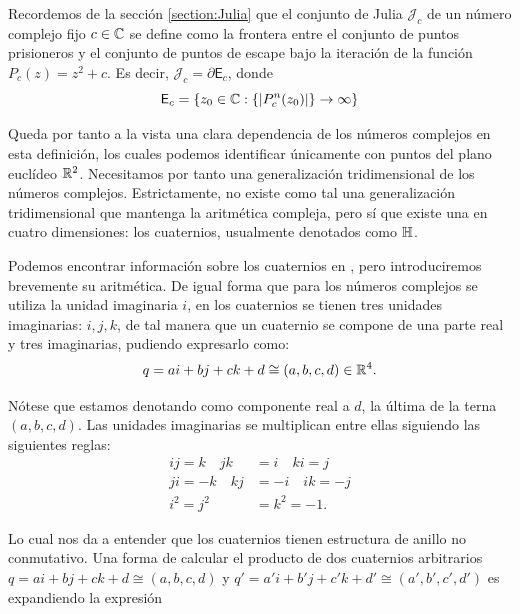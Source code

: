 Recordemos de la sección \ref{section:Julia} que el conjunto de Julia $\mathcal{J}_c$ de un número complejo fijo $c\in\mathbb{C}$ se define como la frontera entre el conjunto de puntos prisioneros y el conjunto de puntos de escape bajo la iteración de la función $P_{c}(z)=z^2+c$. Es decir, $\mathcal{J}_c = \partial \mathsf{E}_c$, donde
\begin{equation}
    \mathsf{E}_c = \{z_0\in\mathbb{C}: \{|P_c^n(z_0)|\}\rightarrow \infty \}
\end{equation}

Queda por tanto a la vista una clara dependencia de los números complejos en esta definición, los cuales podemos identificar únicamente con puntos del plano euclídeo $\mathbb{R}^2$. Necesitamos por tanto una generalización tridimensional de los números complejos. Estrictamente, no existe como tal una generalización tridimensional que mantenga la aritmética compleja, pero sí que existe una en cuatro dimensiones: los cuaternios, usualmente denotados como $\mathbb{H}$.

Podemos encontrar información sobre los cuaternios en \cite{quaternions}, pero introduciremos brevemente su aritmética. De igual forma que para los números complejos se utiliza la unidad imaginaria $i$, en los cuaternios se tienen tres unidades imaginarias: $i,j,k$, de tal manera que un cuaternio se compone de una parte real y tres imaginarias, pudiendo expresarlo como:
\begin{equation}
    q = a i + b j + c k + d \cong (a,b,c,d)\in \mathbb{R}^4.
\end{equation}

Nótese que estamos denotando como componente real a $d$, la última de la terna $(a,b,c,d)$. Las unidades imaginarias se multiplican entre ellas siguiendo las siguientes reglas:
\begin{equation}
    \label{eq:relaciones-cuaternios}
    \begin{split}
        ij = k \quad jk &= i \quad ki = j \\
        ji = -k \quad kj &= -i \quad ik = -j \\
        i^2 = j^2 &= k^2 = -1. 
    \end{split}
\end{equation}

Lo cual nos da a entender que los cuaternios tienen estructura de anillo no conmutativo. Una forma de calcular el producto de dos cuaternios arbitrarios $q = a i + b j + c k + d\cong (a,b,c,d)$ y $q' = a' i + b' j + c'  k + d'\cong (a',b',c',d')$ es expandiendo la expresión

